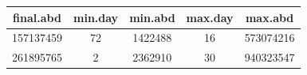 \documentclass[]{article}
\begin{document}
\begin{longtable}[]{@{}ccccc@{}}
\toprule
\begin{minipage}[b]{0.14\columnwidth}\centering\strut
final.abd
\strut\end{minipage} &
\begin{minipage}[b]{0.12\columnwidth}\centering\strut
min.day
\strut\end{minipage} &
\begin{minipage}[b]{0.12\columnwidth}\centering\strut
min.abd
\strut\end{minipage} &
\begin{minipage}[b]{0.12\columnwidth}\centering\strut
max.day
\strut\end{minipage} &
\begin{minipage}[b]{0.12\columnwidth}\centering\strut
max.abd
\strut\end{minipage}\tabularnewline
\midrule
\endhead
\begin{minipage}[t]{0.14\columnwidth}\centering\strut
157137459
\strut\end{minipage} &
\begin{minipage}[t]{0.12\columnwidth}\centering\strut
72
\strut\end{minipage} &
\begin{minipage}[t]{0.12\columnwidth}\centering\strut
1422488
\strut\end{minipage} &
\begin{minipage}[t]{0.12\columnwidth}\centering\strut
16
\strut\end{minipage} &
\begin{minipage}[t]{0.12\columnwidth}\centering\strut
573074216
\strut\end{minipage}\tabularnewline
\begin{minipage}[t]{0.14\columnwidth}\centering\strut
261895765
\strut\end{minipage} &
\begin{minipage}[t]{0.12\columnwidth}\centering\strut
2
\strut\end{minipage} &
\begin{minipage}[t]{0.12\columnwidth}\centering\strut
2362910
\strut\end{minipage} &
\begin{minipage}[t]{0.12\columnwidth}\centering\strut
30
\strut\end{minipage} &
\begin{minipage}[t]{0.12\columnwidth}\centering\strut
940323547
\strut\end{minipage}\tabularnewline

\end{longtable}
\end{document}
